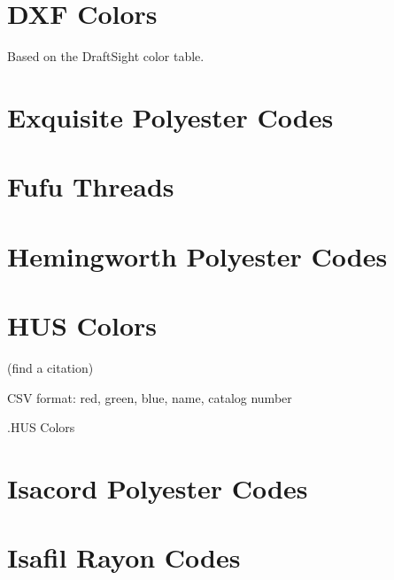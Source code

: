%

\section{DXF Colors}

Based on the DraftSight color table.

%

\section{Exquisite Polyester Codes}

%

\section{Fufu Threads}

%

%

\section{Hemingworth Polyester Codes}

%

\section{HUS Colors}

(find a citation)

CSV format: red, green, blue, name, catalog number

.HUS Colors

%

\section{Isacord Polyester Codes}

%

\section{Isafil Rayon Codes}

%

